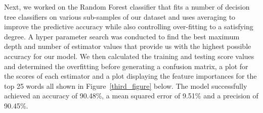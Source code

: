 \documentclass[10pt,twocolumn,letterpaper]{article}
\begin{document}
Next, we worked on the Random Forest classifier that fits a number of decision tree classifiers on various sub-samples of our dataset and uses averaging to improve the predictive accuracy while also controlling over-fitting to a satisfying degree. A hyper parameter search was conducted to find the best maximum depth and number of estimator values that provide us with the highest possible accuracy for our model. We then calculated the training and testing score values and determined the overfitting before generating a confusion matrix, a plot for the scores of each estimator and a plot displaying the feature importances for the top 25 words all shown in Figure~\ref{third_figure} below. The model successfully achieved an accuracy of 90.48\%, a mean squared error of 9.51\% and a precision of 90.45\%.\\ 
\end{document}
